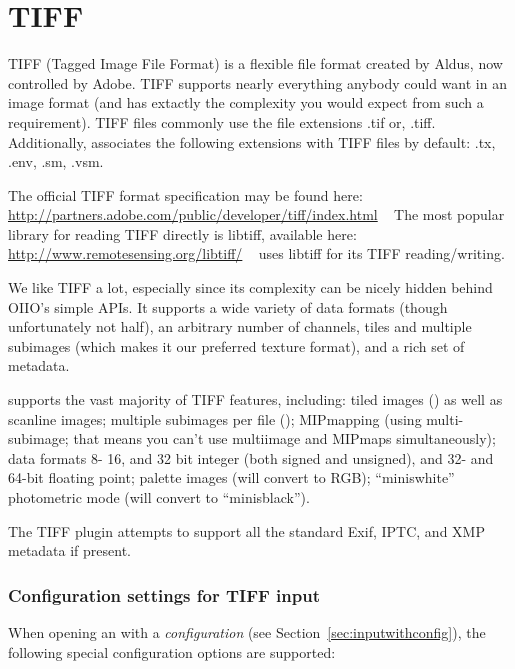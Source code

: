 \vspace{.25in}

\section{TIFF}
\label{sec:bundledplugins:tiff}

TIFF (Tagged Image File Format) is a flexible file format created by
Aldus, now controlled by Adobe.  TIFF supports nearly everything anybody
could want in an image format (and has extactly the complexity you would
expect from such a requirement).
TIFF files commonly use the file extensions {\cf .tif} or, {\cf .tiff}.
Additionally, \product associates the following extensions with TIFF
files by default: {\cf .tx}, {\cf .env}, {\cf .sm}, {\cf .vsm}.

The official TIFF format specification may be found here:
\url{http://partners.adobe.com/public/developer/tiff/index.html} 
~ The most popular library for reading TIFF directly is {\cf libtiff},
available here: 
\url{http://www.remotesensing.org/libtiff/} ~ \product uses {\cf libtiff}
for its TIFF reading/writing.

We like TIFF a lot, especially since its complexity can be nicely hidden
behind OIIO's simple APIs.  It supports a wide variety of data formats
(though unfortunately not {\cf half}), an arbitrary number of channels,
tiles and multiple subimages (which makes it our preferred texture
format), and a rich set of metadata.

\product supports the vast majority of TIFF features, including: tiled
images () as well as scanline images; multiple subimages per
file (); MIPmapping (using multi-subimage; that means 
you can't use multiimage and MIPmaps simultaneously); data formats
8- 16, and 32 bit integer (both signed and unsigned), and 32- and 64-bit
floating point; palette images (will convert to RGB); ``miniswhite''
photometric mode (will convert to ``minisblack'').

The TIFF plugin attempts to support all the standard Exif, IPTC, and XMP
metadata if present.

\subsubsection*{Configuration settings for TIFF input}

When opening an \ImageInput with a \emph{configuration} (see
Section~\ref{sec:inputwithconfig}), the following special configuration
options are supported:

